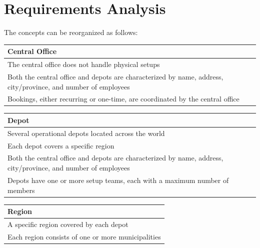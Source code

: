 \section{Requirements Analysis}

The concepts can be reorganized as follows:


\begin{table}[H]
\centering
\begin{tabular}{|p{15cm}|}
\hline
\textbf{Central Office} \\
\hline
The central office does not handle physical setups \\
\hline
Both the central office and depots are characterized by name, address, city/province, and number of employees \\
\hline
Bookings, either recurring or one-time, are coordinated by the central office \\
\hline
\end{tabular}
\end{table}


\begin{table}[H]
\centering
\begin{tabular}{|p{15cm}|}
\hline
\textbf{Depot} \\
\hline
Several operational depots located across the world \\
\hline
Each depot covers a specific region \\
\hline
Both the central office and depots are characterized by name, address, city/province, and number of employees \\
\hline
Depots have one or more setup teams, each with a maximum number of members \\
\hline
\end{tabular}
\end{table}


\begin{table}[H]
\centering
\begin{tabular}{|p{15cm}|}
\hline
\textbf{Region} \\
\hline
A specific region covered by each depot \\
\hline
Each region consists of one or more municipalities \\
\hline
\end{tabular}
\end{table}


